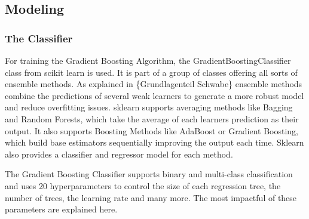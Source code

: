 \subsection{Modeling}

\subsubsection{The Classifier}

For training the Gradient Boosting Algorithm, the GradientBoostingClassifier class from 
scikit learn is used. It is part of a group of classes offering all sorts of ensemble methods.
As explained in \{Grundlagenteil Schwabe\} ensemble methods combine the predictions of several
weak learners to generate a more robust model and reduce overfitting issues.
sklearn supports averaging methods like Bagging and Random Forests, which take the average of each learners prediction
as their output. It also supports Boosting Methods like AdaBoost or Gradient Boosting, which
build base estimators sequentially improving the output each time. Sklearn also provides 
a classifier and regressor model for each method.

The Gradient Boosting Classifier supports binary and multi-class classification and uses
20 hyperparameters to control the size of each regression tree, the number of trees,
the learning rate and many more. The most impactful of these parameters are explained here.

